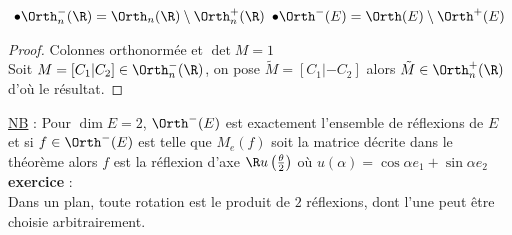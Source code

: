 		${}$ \hfill $\bullet \Orth_n^-(\R) = \Orth_n(\R)\setminus\Orth_n^+(\R)$ \hfill $\bullet \Orth^-(E) = \Orth(E) \setminus\Orth^+(E)$ \hfill ${}$
		\vspace*{0.5cm} \\ 
		\begin{proof}
		\fbox{$\Leftarrow$} Colonnes orthonormée et $\det M=1$\\
		\fbox{$\Rightarrow$} Soit $M=[C_1 | C_2] \in \Orth_n^-(\R)$, on pose $\tilde{M} = [C_1 | -C_2]$ alors $\tilde{M}\in \Orth_n^+(\R)$ d'où le résultat.
		\end{proof}
		\uline{NB} : Pour $\dim E=2$, $\Orth^-(E)$ est exactement l'ensemble de réflexions de $E$ et si $f\in\Orth^-(E)$ est telle que $M_e(f)$ soit la matrice décrite dans le théorème alors $f$ est la réflexion d'axe $\R u\left(\frac{\theta}{2}\right)$ où $u(\alpha) = \cos\alpha e_1 + \sin\alpha e_2$
		\vspace*{0.5cm} \\ \textbf{exercice} : \\
		Dans un plan, toute rotation est le produit de $2$ réflexions, dont l'une peut être choisie arbitrairement.
